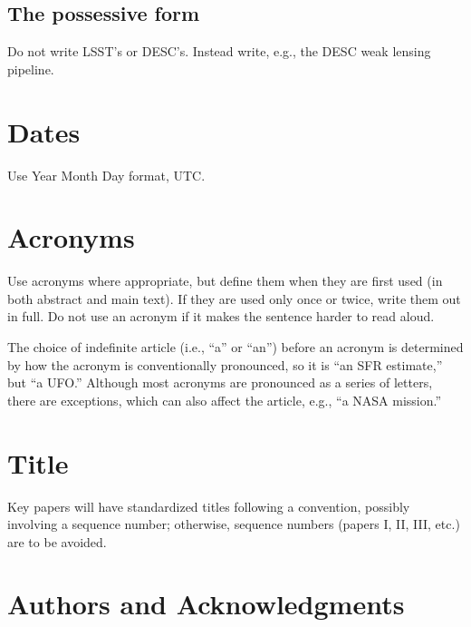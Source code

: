 \documentclass[letterpaper,11pt]{article}
\begin{document}


\subsection{The possessive form}

Do not write LSST's or DESC's.  Instead write, e.g., the DESC weak lensing pipeline.

\section{Dates}

Use Year Month Day format, UTC.


\section{Acronyms}

Use acronyms where appropriate, but define them when they are first used
(in both
abstract and main text).  If they are used only once or twice, write them out
in full.  Do not use an acronym if it makes the sentence harder to read aloud.

The choice of indefinite article (i.e., ``a'' or ``an'') before an
acronym is determined by how the acronym is conventionally pronounced,
so it is ``an SFR estimate,'' but ``a UFO.''  Although most acronyms are
pronounced as a series of letters, there are exceptions, which can also affect
the article, e.g., ``a NASA mission.''

\section{Title}

Key papers will have standardized titles following a  convention, possibly involving a sequence number; otherwise, sequence numbers (papers I, II, III, etc.) are to be avoided.

\section{Authors and Acknowledgments}
\end{document}
